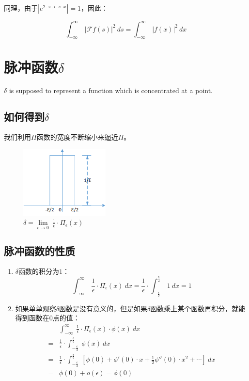同理，由于$|e^{2\cdot \pi\cdot i\cdot s\cdot x}|=1$，因此：

\[\int_{-\infty}^{\infty}\ |\mathcal{F}f(s)|^2\ ds=\int_{-\infty}^{\infty}\ |f(x)|^2\ dx\]

\section{脉冲函数$\delta$}
$\delta$ is supposed to represent a function which is concentrated at a point.
\subsection{如何得到$\delta$}
我们利用$\Pi$函数的宽度不断缩小来逼近$\Pi$。
\begin{figure}[H]
	\centering
	\includegraphics[width=0.4\textwidth]{assets/delta.png}
	\caption{$\delta=\lim\limits_{\epsilon\rightarrow 0}\ \frac{1}{\epsilon}\cdot \Pi_\epsilon(x)$}
\end{figure}
\subsection{脉冲函数的性质}
\begin{enumerate}
	\item $\delta$函数的积分为$1$：
	      $$
		      \int_{-\infty}^{\infty}\ \frac{1}{\epsilon}\cdot \Pi_\epsilon(x)\ dx=\frac{1}{\epsilon}\cdot \int_{-\frac{\epsilon}{2}}^{\frac{\epsilon}{2}}\ 1\ dx=1
	      $$
	\item 如果单单观察$\delta$函数是没有意义的，但是如果$\delta$函数乘上某个函数再积分，就能得到函数在$0$点的值：
	      \begin{align*}
		        & \int_{-\infty}^{\infty}\ \frac{1}{\epsilon}\cdot \Pi_\epsilon(x)\cdot \phi(x)\ dx                                                           \\
		      = & \frac{1}{\epsilon}\cdot \int_{-\frac{\epsilon}{2}}^{\frac{\epsilon}{2}}\ \phi(x)\ dx                                                        \\
		      = & \frac{1}{\epsilon}\cdot \int_{-\frac{\epsilon}{2}}^{\frac{\epsilon}{2}}\ [\phi(0)+\phi'(0)\cdot x+\frac{1}{2}\phi''(0)\cdot x^2+\cdots]\ dx \\
		      = & \phi(0)+o(\epsilon)  = \phi(0)
	      \end{align*}
\end{enumerate}
